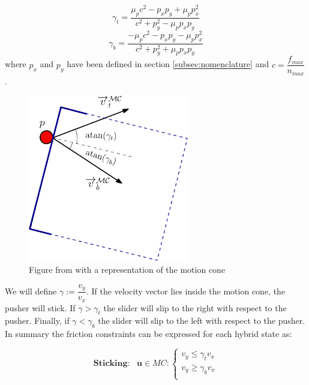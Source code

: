 \documentclass[12,twoside]{TFG-GM}
\theoremstyle{definition}
\theoremstyle{remark}
\begin{document}
\begin{equation}
\gamma_t = \dfrac{\mu_p c^2 - p_x p_y + \mu_p p_x^2}{c^2 + p_y^2 - \mu_p p_x p_y}
\end{equation}
\begin{equation}
\gamma_b = \dfrac{-\mu_p c^2 - p_x p_y - \mu_p p_x^2}{c^2 + p_y^2 + \mu_p p_x p_y}
\end{equation}
where $p_x$ and $p_y$ have been defined in section \ref{subsec:nomenclature} and $c = \dfrac{f_{max}}{n_{max}}$.

\begin{figure}[htb!]
\begin{center}
\includegraphics[width=7cm]{MotionCone-eps-converted-to.pdf}
\end{center}
\caption[test caption]{\label{fig:motion_cone} \small{Figure from \protect\cite{fom} with a representation of the motion cone}}
\end{figure}

We will define $\gamma := \dfrac{v_y}{v_x}$. If the velocity vector lies inside the motion cone, the pusher will stick. If $\gamma > \gamma_t$ the slider will slip to the right with respect to the pusher. Finally, if $\gamma < \gamma_b$ the slider will slip to the left with respect to the pusher. In summary the friction constraints can be expressed for each hybrid state as:

\begin{equation} \label{eq:sticking_cone}
\textbf{Sticking:}\,\,\,\,\, \textbf{u} \in MC: 
			\begin{cases}
               v_y \leq \gamma_t v_x\\
               v_y \geq \gamma_b v_x\\
            \end{cases}
\end{equation}
\end{document}
